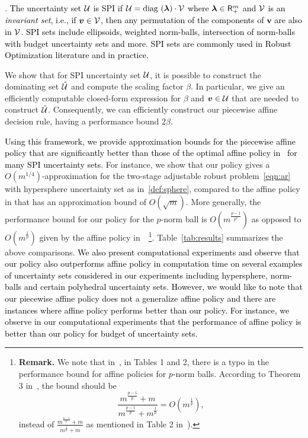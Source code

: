 \documentclass[11pt]{article}
\theoremstyle{plain}
\theoremstyle{definition}
\numberwithin{equation}{section}%
\numberwithin{equation}{section}%
\newcommand{\mb}[1]{\ensuremath{\boldsymbol{#1}}}
\newcommand*{\red}{\textcolor{black}}
\begin{document}


\vspace{3mm}
\noindent {\bf \red{Results for Scaled Permutation Invariant (SPI) Sets}}. \red{The uncertainty set ${\cal U}$ is SPI if ${\cal U} = \mbox{diag } ( \mb \lambda) \cdot {\cal V}$ where $\mb \lambda \in {\sf R}_+^m$ and ${\cal V}$ is an {\it invariant set}, i.e., if $\mb{v} \in {\cal V}$, then any permutation of the components of $\mb{v}$ are also in ${\cal V}$. SPI sets include ellipsoids, weighted norm-balls, intersection of norm-balls with budget uncertainty sets and more.  SPI sets are commonly used in Robust Optimization literature and in practice.}

We show that for SPI uncertainty set ${\cal U}$, it is possible to construct the dominating set $\hat{\cal U}$ and compute the scaling factor $\beta$.  In particular, we give an efficiently computable closed-form expression for $\beta$ and $\mb{v} \in {\cal U}$ that are needed to construct $\hat{\cal U}$.  Consequently, we can efficiently construct our piecewise affine decision rule, having a performance bound $2\beta$.


\red{Using this framework, we provide approximation bounds for the piecewise affine policy that are significantly better than those of the optimal affine policy in~\cite{BB15} for many SPI uncertainty sets}. For instance, we show that our policy gives a  $O (m^{1/4})$-approximation for the two-stage adjustable robust problem~\eqref{eqn:ar} with hypersphere uncertainty set as in~\eqref{def:sphere}, compared to the affine policy in \cite{BB15} that has an approximation bound of $O(\sqrt{m})$. More generally, the performance bound for our policy for the $p$-norm ball is $ O ( m^{\frac{p-1}{p^2}} )$ as opposed to $ O  ( m^\frac{1}{p} ) $ given by the affine policy in~\cite{BB15}~\footnote{\textbf{Remark.} We note that in~\cite{BB15}, in Tables 1 and 2, there is a typo in the performance bound for affine policies for $p$-norm balls. According to Theorem 3 in~\cite{BB15}, the bound should be
$$\frac{m^{\frac{p-1}{p}}+m}{m^{\frac{p-1}{p}}+m^{\frac{1}{p}}}= O \left(m^{\frac{1}{p}} \right),$$
instead of $\frac{m^{\frac{p-1}{p}}+m}{m^{\frac{1}{p}}+m}$ as mentioned in Table 2 in~\cite{BB15}).
}. Table~\ref{tab:results} summarizes the above comparisons.  \red{We also present computational experiments and observe that our policy also outperforms affine policy in computation time on several examples of uncertainty sets considered in our experiments including hypersphere, norm-balls and certain polyhedral uncertainty sets.  However, we would like to note that our piecewise affine policy does not a generalize affine policy and there are instances where affine policy performs better than our policy. For instance, we observe in our computational experiments that the performance of affine policy is better than our policy for budget of uncertainty sets.}
\end{document}
